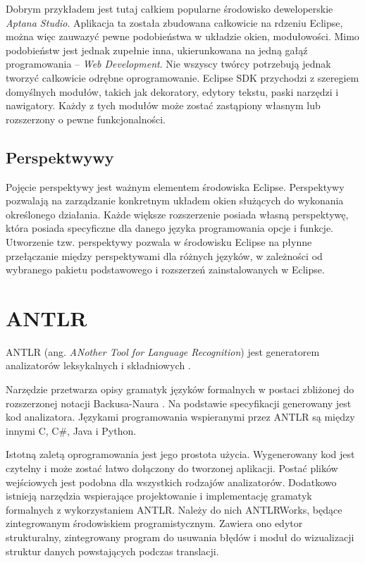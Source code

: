 Dobrym przykładem jest tutaj całkiem popularne środowisko deweloperskie \emph{Aptana Studio}. Aplikacja ta została zbudowana całkowicie na rdzeniu Eclipse, można więc zauwazyć pewne podobieństwa w układzie okien, modułowości. Mimo podobieństw jest jednak zupełnie inna, ukierunkowana na jedną gałąź programowania – \emph{Web Development}. Nie wszyscy twórcy potrzebują jednak tworzyć całkowicie odrębne oprogramowanie. Eclipse SDK przychodzi z szeregiem domyślnych modułów, takich jak dekoratory, edytory tekstu, paski narzędzi i nawigatory. Każdy z tych modułów może zostać zastąpiony własnym lub rozszerzony o pewne funkcjonalności.

\subsection{Perspektwywy}
Pojęcie perspektywy jest ważnym elementem środowiska Eclipse. Perspektywy pozwalają na zarządzanie konkretnym układem okien służących do wykonania określonego działania. Każde większe rozszerzenie posiada własną perspektywę, która posiada specyficzne dla danego języka programowania opcje i funkcje. Utworzenie tzw. perspektywy pozwala w środowisku Eclipse na płynne przełączanie między perspektywami dla różnych języków, w zależności od wybranego pakietu podstawowego i rozszerzeń zainstalowanych w Eclipse.

\section{ANTLR}
ANTLR (ang. \emph{ANother Tool for Language Recognition}) jest generatorem
analizatorów leksykalnych i składniowych \cite{antlr}.

Narzędzie przetwarza opisy gramatyk języków formalnych w postaci 
zbliżonej do rozszerzonej notacji
 Backusa-Naura \cite{antlr}. Na podstawie specyfikacji generowany jest kod analizatora.
Językami programowania wspieranymi przez ANTLR są między innymi C, C\#, Java
i Python.

Istotną zaletą oprogramowania jest jego prostota użycia. Wygenerowany kod 
jest czytelny i może zostać łatwo dołączony do tworzonej aplikacji. Postać plików
wejściowych jest podobna dla wszystkich rodzajów analizatorów. Dodatkowo
istnieją narzędzia wspierające projektowanie i implementację gramatyk
formalnych z wykorzystaniem ANTLR. Należy do nich ANTLRWorks, będące
zintegrowanym środowiskiem programistycznym. Zawiera ono edytor strukturalny,
zintegrowany program do usuwania błędów i moduł do wizualizacji struktur 
danych powstających podczas translacji.

